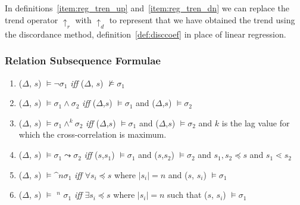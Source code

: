 In definitions~\ref{item:reg_tren_up} and~\ref{item:reg_tren_dn} we
can replace the trend operator $\uparrow_r$ with $\uparrow_d$ to
represent that we have obtained the trend using the discordance
method, definition~\ref{def:disccoef} in place of linear regression.

\subsubsection{Relation Subsequence Formulae}

\begin{enumerate}


\item ($\Delta$, $s$) $\models \neg  \sigma_1$ {
\em iff } ($\Delta$, $s$) $\not\models \sigma_1$ 



\item ($\Delta$, $s$) $\models \sigma_1 \wedge \sigma_2$ { \em iff }
($\Delta$,$s$) 
$\models \sigma_1$ and ($\Delta$,$s$) $\models \sigma_2$ 



\item ($\Delta$, $s$) $\models \sigma_1 \wedge^k \sigma_2$ { \em iff }
($\Delta$,$s$) 
$\models \sigma_1$ and ($\Delta$,$s$) $\models \sigma_2$ and $k$ is
the lag value for which the cross-correlation is maximum.


\item\label{item:leadsto} ($\Delta$, $s$) $\models \sigma_1 \leadsto \sigma_2$ { \em iff } ($s$,$s_1$)
$\models \sigma_1$ and ($s$,$s_2$) $\models \sigma_2$ and $s_1,s_2 \preceq 
s$ and $s_1 \lessdot s_2$




\item\label{item:fixed} ($\Delta$, $s$) $\models \bm^n \sigma_1$ { \em
iff }
$\forall s_i \preceq  s$ where $\mid s_i \mid = n$ and ($s$, $s_i$) $\models \sigma_1$




\item\label{item:guarantee} ($\Delta$, $s$) $\models$ \diam$^n$
$\sigma_1$ { \em iff }
$\exists s_i \preceq s$ where $\mid s_i \mid = n$ such that ($s$,
$s_i$) $\models \sigma_1$

\end{enumerate}

